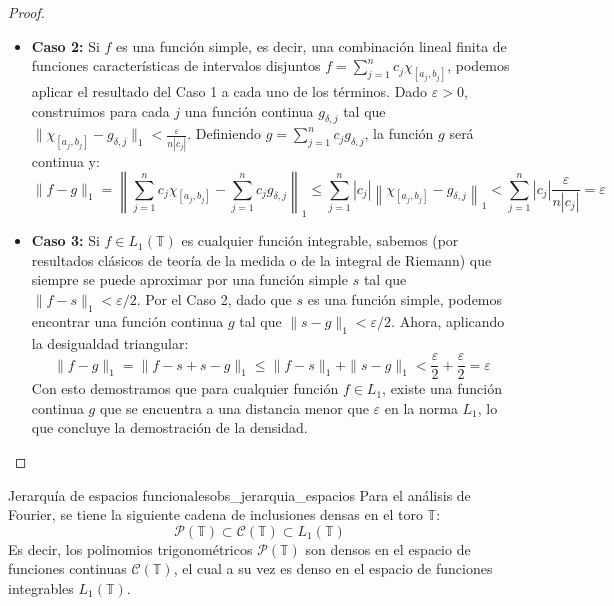\begin{proof}
\begin{itemize}
\begin{center}
    \end{center}

    \item \textbf{Caso 2:} Si $f$ es una función simple, es decir, una combinación lineal finita de funciones características de intervalos disjuntos $f = \sum_{j=1}^n c_j \chi_{[a_j, b_j]}$, podemos aplicar el resultado del Caso 1 a cada uno de los términos. Dado $\varepsilon > 0$, construimos para cada $j$ una función continua $g_{\delta,j}$ tal que $\|\chi_{[a_j, b_j]} - g_{\delta,j}\|_1 < \frac{\varepsilon}{n|c_j|}$. Definiendo $g = \sum_{j=1}^n c_j g_{\delta,j}$, la función $g$ será continua y:
    \begin{equation*}
        \|f - g\|_1 = \left\| \sum_{j=1}^n c_j \chi_{[a_j, b_j]} - \sum_{j=1}^n c_j g_{\delta,j} \right\|_1 \le \sum_{j=1}^n |c_j| \left\| \chi_{[a_j, b_j]} - g_{\delta,j} \right\|_1 < \sum_{j=1}^n |c_j| \frac{\varepsilon}{n|c_j|} = \varepsilon
    \end{equation*}

    \item \textbf{Caso 3:} Si $f \in L_1(\mathbb{T})$ es cualquier función integrable, sabemos (por resultados clásicos de teoría de la medida o de la integral de Riemann) que siempre se puede aproximar por una función simple $s$ tal que $\|f - s\|_1 < \varepsilon/2$. Por el Caso 2, dado que $s$ es una función simple, podemos encontrar una función continua $g$ tal que $\|s - g\|_1 < \varepsilon/2$. Ahora, aplicando la desigualdad triangular:
    \begin{equation*}
        \|f - g\|_1 = \|f - s + s - g\|_1 \le \|f - s\|_1 + \|s - g\|_1 < \frac{\varepsilon}{2} + \frac{\varepsilon}{2} = \varepsilon
    \end{equation*}
    Con esto demostramos que para cualquier función $f \in L_1$, existe una función continua $g$ que se encuentra a una distancia menor que $\varepsilon$ en la norma $L_1$, lo que concluye la demostración de la densidad.
\end{itemize}
\end{proof}

\begin{observacion}{Jerarquía de espacios funcionales}{obs_jerarquia_espacios}
    Para el análisis de Fourier, se tiene la siguiente cadena de inclusiones densas en el toro $\mathbb{T}$:
    \[
    \mathcal{P}(\mathbb{T}) \subset \mathcal{C}(\mathbb{T}) \subset L_1(\mathbb{T})
    \]
    Es decir, los polinomios trigonométricos $\mathcal{P}(\mathbb{T})$ son densos en el espacio de funciones continuas $\mathcal{C}(\mathbb{T})$, el cual a su vez es denso en el espacio de funciones integrables $L_1(\mathbb{T})$.
\end{observacion}


